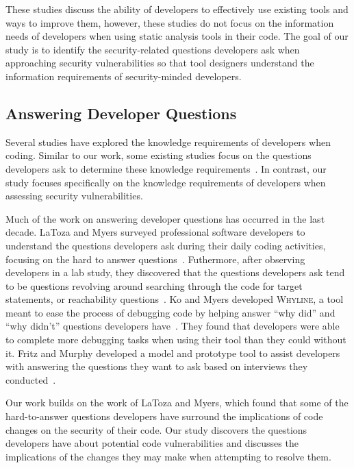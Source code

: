 \documentclass[conference]{IEEEtran}
\begin{document}
These studies discuss the ability of developers to effectively use existing tools and ways to improve them, however, these studies do not focus on the information needs of developers when using static analysis tools in their code. 
The goal of our study is to identify the security-related questions developers ask when approaching security vulnerabilities so that tool designers understand the information requirements of security-minded developers.

\subsection{Answering Developer Questions}
\label{questions}
Several studies have explored the knowledge requirements of developers when coding.
Similar to our work, some existing studies focus on the questions developers ask to determine these knowledge requirements~\cite{latoza2010hard, latoza2010developers}.
In contrast, our study focuses specifically on the knowledge requirements of developers when assessing security vulnerabilities.


Much of the work on answering developer questions has occurred in the last decade. 
LaToza and Myers surveyed professional software developers to understand the questions developers ask during their daily coding activities, focusing on the hard to answer questions~\cite{latoza2010hard}. 
Futhermore, after observing developers in a lab study, they discovered that the questions developers ask tend to be questions revolving around searching through the code for target statements, or reachability questions~\cite{latoza2010developers}. 
Ko and Myers developed \textsc{Whyline}, a tool meant to ease the process of debugging code by helping answer ``why did'' and ``why didn't'' questions developers have~\cite{ko2004designing}. 
They found that developers were able to complete more debugging tasks when using their tool than they could without it.
Fritz and Murphy developed a model and prototype tool to assist developers with answering the questions they want to ask based on interviews they conducted~\cite{fritz2010using}.

Our work builds on the work of LaToza and Myers, which found that some of the hard-to-answer questions developers have surround the implications of code changes on the security of their code. 
Our study discovers the questions developers have about potential code vulnerabilities and discusses the implications of the changes they may make when attempting to resolve them. 
\end{document}
